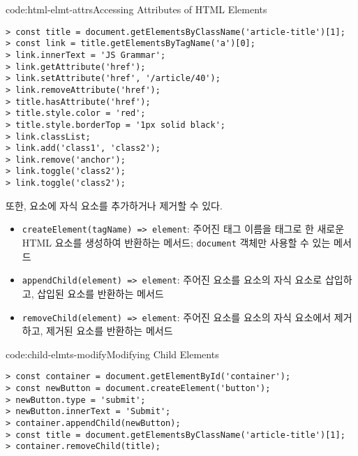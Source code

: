 \begin{codeenv}{code:html-elmt-attrs}{Accessing Attributes of HTML Elements}\begin{verbatim}
> const title = document.getElementsByClassName('article-title')[1];
> const link = title.getElementsByTagName('a')[0];
> link.innerText = 'JS Grammar';
> link.getAttribute('href');
> link.setAttribute('href', '/article/40');
> link.removeAttribute('href');
> title.hasAttribute('href');
> title.style.color = 'red';
> title.style.borderTop = '1px solid black';
> link.classList;
> link.add('class1', 'class2');
> link.remove('anchor');
> link.toggle('class2');
> link.toggle('class2');
\end{verbatim}
\end{codeenv}

또한, 요소에 자식 요소를 추가하거나 제거할 수 있다.

\begin{itemize}
    \item \texttt{createElement(tagName) => element}: 주어진 태그 이름을 태그로 한 새로운 HTML 요소를 생성하여 반환하는 메서드; \texttt{document} 객체만 사용할 수 있는 메서드
    \item \texttt{appendChild(element) => element}: 주어진 요소를 요소의 자식 요소로 삽입하고, 삽입된 요소를 반환하는 메서드
    \item \texttt{removeChild(element) => element}: 주어진 요소를 요소의 자식 요소에서 제거하고, 제거된 요소를 반환하는 메서드
\end{itemize}

\begin{codeenv}{code:child-elmts-modify}{Modifying Child Elements}\begin{verbatim}
> const container = document.getElementById('container');
> const newButton = document.createElement('button');
> newButton.type = 'submit';
> newButton.innerText = 'Submit';
> container.appendChild(newButton);
> const title = document.getElementsByClassName('article-title')[1];
> container.removeChild(title);
\end{verbatim}
\end{codeenv}

